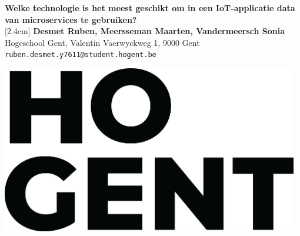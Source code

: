 \documentclass[a0,portrait]{a0poster}
\begin{document}


\begin{minipage}[t]{0.75\linewidth}
\VeryHuge \color{HoGentAccent1} \textbf{Welke technologie is het meest geschikt om in een IoT-applicatie data van microservices te gebruiken?} \color{Black}\\ %
[2.4cm] %
\huge \textbf{Desmet Ruben, Meersseman Maarten, Vandermeersch Sonia}\\[0.5cm] %
\huge Hogeschool Gent, Valentin Vaerwyckweg 1, 9000 Gent\\[0.4cm] %
\Large \texttt{ruben.desmet.y7611@student.hogent.be} \\
\end{minipage}
%
\begin{minipage}[t]{0.25\linewidth}
\includegraphics[width=13cm,right]{figures/HG-woordmerk.jpg} 

\end{minipage}

\vspace{1cm} %

\end{document}
